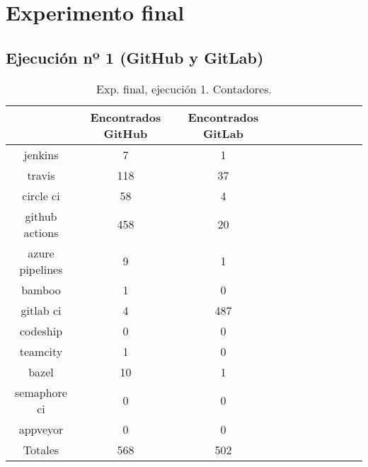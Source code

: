 \newpage

\section{Experimento final}

\subsection{Ejecución nº 1 (GitHub y GitLab)}

\begin{table}[h!]
  \centering
  \caption{Exp. final, ejecución 1. Contadores.}
  \label{tab:tabla_f1_1}

\begin{footnotesize}
\renewcommand{\arraystretch}{1.5} %
\begin{tabular}{ccccccccccc}
  \hline
  {} &  Encontrados GitHub &  Encontrados GitLab \\
  \hline
  jenkins         &                   7 &                   1 \\
  travis          &                 118 &                  37 \\
  circle ci       &                  58 &                   4 \\
  github actions  &                 458 &                  20 \\
  azure pipelines &                   9 &                   1 \\
  bamboo          &                   1 &                   0 \\
  gitlab ci       &                   4 &                 487 \\
  codeship        &                   0 &                   0 \\
  teamcity        &                   1 &                   0 \\
  bazel           &                  10 &                   1 \\
  semaphore ci    &                   0 &                   0 \\
  appveyor        &                   0 &                   0 \\
  \hline
  Totales         &                 568 &                 502 \\
 \end{tabular}
\end{footnotesize}

\end{table}

